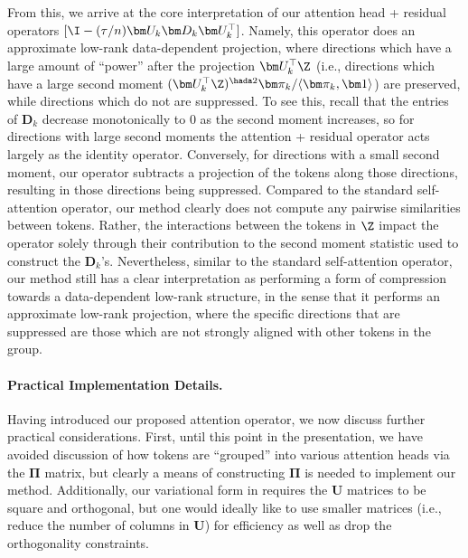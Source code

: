 \documentclass[../../book-main.tex]{subfiles}
\begin{document}
From this, we arrive at the core interpretation of our attention head + residual
operators $[\I - (\tau/n)\bm U_{k}\bm D_{k}\bm U_{k}^{\top}]$.  Namely, this
operator does an approximate low-rank data-dependent projection, where
directions which have a large amount of ``power'' after the projection $\bm
U_k^\top \Z$ (i.e., directions which have a large second moment $(\bm
U_{k}^{\top}\Z)^{\hada 2}\bm \pi_k / \langle \bm \pi_{k}, \bm 1\rangle$) are preserved, while directions which do not are suppressed. To see this, recall that the entries of $\bm D_k$ decrease monotonically to 0 as the second moment increases, so for directions with large second moments the attention + residual operator acts largely as the identity operator.  Conversely, for directions with a small second moment, our operator subtracts a projection of the tokens along those directions, resulting in those directions being suppressed. Compared to the standard self-attention operator, our method clearly does not compute any pairwise similarities between tokens. Rather, the interactions between the tokens in $\Z$ impact the operator solely through their contribution to the second moment statistic used to construct the $\bm D_{k}$'s.  Nevertheless, similar to the standard self-attention operator, our method still has a clear interpretation as performing a form of compression towards a data-dependent low-rank structure, in the sense that it performs an approximate low-rank projection, where the specific directions that are suppressed are those which are not strongly aligned with other tokens in the group.

\paragraph{Practical Implementation Details.} Having introduced our proposed attention operator, we now discuss further practical considerations.  First, until this point in the presentation, we have avoided discussion of how tokens are ``grouped'' into various attention heads via the $\bm\Pi$ matrix, but clearly a means of constructing $\bm\Pi$ is needed to implement our method.  Additionally, our variational form in  requires the $\bm U$ matrices to be square and orthogonal, but one would ideally like to use smaller matrices (i.e., reduce the number of columns in $\bm U$) for efficiency as well as drop the orthogonality constraints. 
\end{document}
